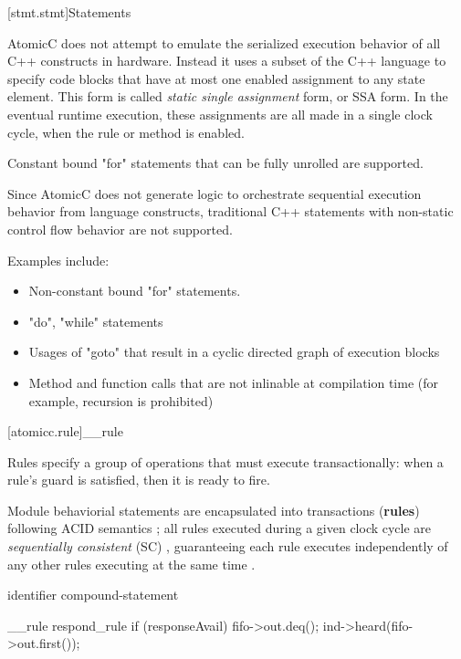 [stmt.stmt]{Statements}%


AtomicC does not attempt to emulate the serialized execution
behavior of all C++ constructs in hardware.
Instead it uses a subset of the C++ language to specify
code blocks that have at most
one enabled assignment to any state element.
This form is called \textit{static single assignment} form,
or SSA form\cite{Alpern:1988}.
In the eventual runtime execution, these assignments are
all made in a single clock cycle, when the rule or method
is enabled.

Constant bound "for" statements that can be fully unrolled are supported.

Since AtomicC does not generate logic to orchestrate sequential execution behavior from
language constructs,
traditional C++ statements with non-static control flow behavior are not supported.

Examples include:
\begin{itemize}
\item Non-constant bound "for" statements.  
\item "do", "while" statements
\item Usages of "goto" that result in a cyclic directed graph of execution blocks
\item Method and function calls that are not inlinable at compilation time (for example, recursion is prohibited)
\end{itemize}


[atomicc.rule]{__rule}

Rules specify a group of operations that must
execute transactionally: when a rule's guard
is satisfied, then it is ready to fire.

Module behaviorial statements are encapsulated into transactions (\textbf{rules})
following ACID semantics
\cite{NikhilSemantics,GrayR93};
all rules executed during a given clock cycle are
\textit{sequentially consistent} (SC) \cite{Lamport:1979:MMC:1311099.1311750},
guaranteeing each rule executes
independently of any other rules executing at the same time
\cite[Sec.~7.1]{GrayR93}.

\begin{bnf}
\br
     identifier  compound-statement\br

\end{bnf}

\begin{example}
\begin{codeblock}
     __rule respond_rule if (responseAvail) {
         fifo->out.deq();
         ind->heard(fifo->out.first());
     }
\end{codeblock}
\end{example}

